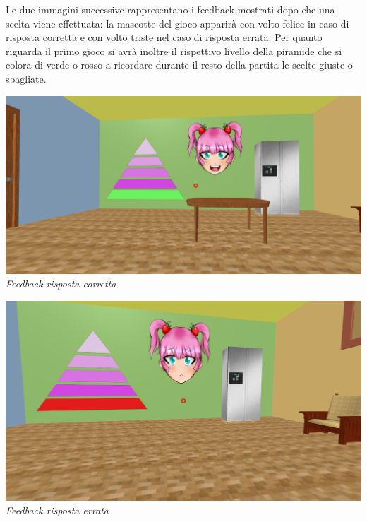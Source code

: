 Le due immagini successive rappresentano i feedback mostrati dopo che una scelta viene effettuata: la mascotte del gioco apparirà con volto felice in caso di risposta corretta e con volto triste nel caso di risposta errata. Per quanto riguarda il primo gioco si avrà inoltre il rispettivo livello della piramide che si colora di verde o rosso a ricordare durante il resto della partita le scelte giuste o sbagliate.
\begin{center}
\includegraphics[width=.70\textwidth]{Images/Design/Correct}\\
\vspace{5px}
\emph{Feedback risposta corretta}\bigskip
\end{center}
\begin{center}
\includegraphics[width=.70\textwidth]{Images/Design/Wrong}\\
\vspace{5px}
\emph{Feedback risposta errata}\bigskip
\end{center}